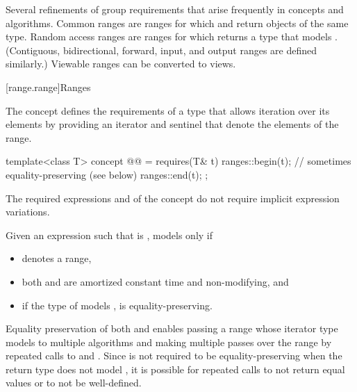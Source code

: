 \pnum
Several refinements of  group requirements
that arise frequently in concepts and algorithms.
Common ranges are ranges for which
 and 
return objects of the same type.
Random access ranges are ranges for which 
returns a type that models
.
(Contiguous, bidirectional, forward, input, and output ranges
are defined similarly.)
Viewable ranges can be converted to views.

[range.range]{Ranges}

\pnum
The  concept defines the requirements of a type that allows
iteration over its elements by providing an iterator and sentinel
that denote the elements of the range.

\begin{itemdecl}
template<class T>
  concept @@ =
    requires(T& t) {
      ranges::begin(t);         // sometimes equality-preserving (see below)
      ranges::end(t);
    };
\end{itemdecl}

\begin{itemdescr}
\pnum
The required expressions
and
of the  concept
do not require implicit expression variations.

\pnum
Given an expression  such that  is ,
 models  only if
\begin{itemize}
\item {}
  denotes a range,

\item both
and
are amortized constant time and non-modifying, and

\item if the type of  models
,  is equality-preserving.
\end{itemize}

\pnum
\begin{note}
Equality preservation of both  and
 enables passing a range whose iterator
type models  to multiple
algorithms and making multiple passes over the range by repeated calls to
 and .
Since  is not required to be equality-preserving
when the return type does not model ,
it is possible for repeated calls
to not return equal values or to not be well-defined.
\end{note}
\end{itemdescr}

